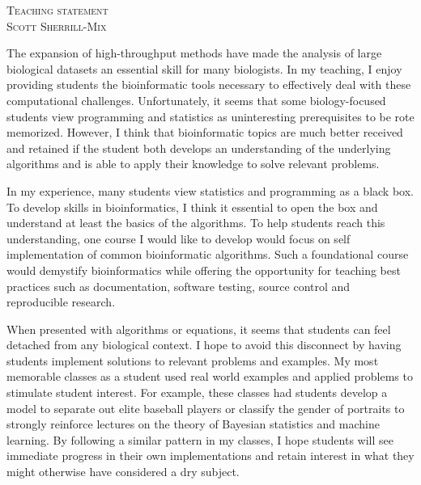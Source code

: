 \documentclass[12pt]{article}
\date{\today}
\begin{document}

\begin{center}
\fontsize{19}{21}\textsc{Teaching statement}\\
\vspace{.4em}
\fontsize{14}{17}\textsc{Scott Sherrill-Mix}
\end{center}

The expansion of high-throughput methods have made the analysis of large biological datasets an essential skill for many biologists. In my teaching, I enjoy providing students the bioinformatic tools necessary to effectively deal with these computational challenges. Unfortunately, it seems that some biology-focused students view programming and statistics as uninteresting prerequisites to be rote memorized. However, I think that bioinformatic topics are much better received and retained if the student both develops an understanding of the underlying algorithms and is able to apply their knowledge to solve relevant problems. 

In my experience, many students view statistics and programming as a black box.  To develop skills in bioinformatics, I think it essential to open the box and understand at least the basics of the algorithms.  To help students reach this understanding, one course I would like to develop would focus on self implementation of common bioinformatic algorithms. Such a foundational course would demystify bioinformatics while offering the opportunity for teaching best practices such as documentation, software testing, source control and reproducible research. 

When presented with algorithms or equations, it seems that students can feel detached from any biological context. I hope to avoid this disconnect by having students implement solutions to relevant problems and examples. My most memorable classes as a student used real world examples and applied problems to stimulate student interest. For example, these classes had students develop a model to separate out elite baseball players or classify the gender of portraits to strongly reinforce lectures on the theory of Bayesian statistics and machine learning. By following a similar pattern in my classes, I hope students will see immediate progress in their own implementations and retain interest in what they might otherwise have considered a dry subject.
  
\end{document}
